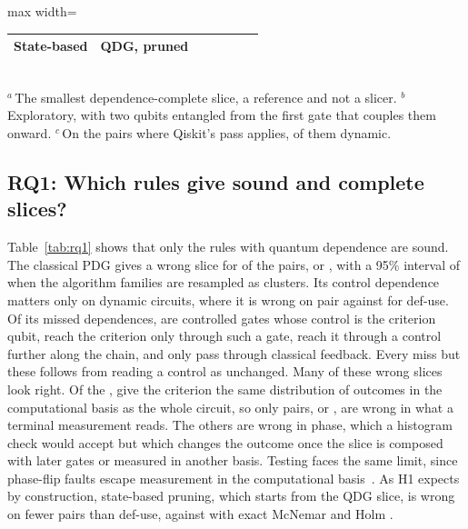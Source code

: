 \begin{table}[t]
\begin{adjustbox}{max width=\columnwidth}
\begin{tabular}{@{}l l r r r r r@{}}
    State-based        & QDG, pruned           & \numRqOneQUnsound{}    & \numQDynamicUnsound{}    & \numRqOneQRecall{}    & \numRqOneQPrecision{}    & \numRqOneQSize{} \\
    \bottomrule
  \end{tabular}
  \end{adjustbox}\\[2pt]
  {\footnotesize $^{a}$\,The smallest dependence-complete slice, a reference and not a slicer.
  $^{b}$\,Exploratory, with two qubits entangled from the first gate that couples them
  onward. $^{c}$\,On the \numLcqApplicable{} pairs where Qiskit's pass applies, \numLcqDynamicN{} of them dynamic.}
\end{table}

\subsection{RQ1: Which rules give sound and complete slices?}

Table~\ref{tab:rq1} shows that only the rules with quantum dependence are sound. The classical PDG gives a
wrong slice for \numCpdgUnsound{} of the \numNPairs{} pairs, or \numCpdgUnsoundPct{}, with a 95\% interval of
\numCcCpdgUnsound{} when the \numCcFamilies{} algorithm families are resampled as clusters. Its control
dependence matters only on dynamic circuits, where it is wrong on \numCpdgDynamicUnsound{} pair against
\numDuDynamicUnsound{} for def-use. Of its \numCpdgMissTotal{} missed dependences, \numCpdgMissSameWire{} are controlled gates whose control
is the criterion qubit, \numCpdgMissKickback{} reach the criterion only through such a gate,
\numCpdgMissWritten{} reach it through a control further along the chain, and only \numCpdgMissFeedback{}
pass through classical feedback. Every miss but these \numCpdgMissFeedback{} follows from reading a control
as unchanged.
Many of these wrong slices look right. Of the \numCpdgUnsound{}, \numFdCpdgZMatch{} give the criterion the
same distribution of outcomes in the computational basis as the whole circuit, so only
\numFdCpdgObservable{} pairs, or \numFdCpdgObservablePct{}, are wrong in what a terminal measurement reads.
The others are wrong in phase, which a histogram check would accept but which changes the outcome once the
slice is composed with later gates or measured in another basis. Testing faces the same limit, since
phase-flip faults escape measurement in the computational basis~\cite{oldfield2024faster}. As H1 expects by construction, state-based
pruning, which starts from the QDG slice, is wrong on fewer pairs than def-use, \numRqOneQUnsound{} against
\numRqOneDuUnsound{} with exact McNemar and Holm \numHOnePHolm{}.


